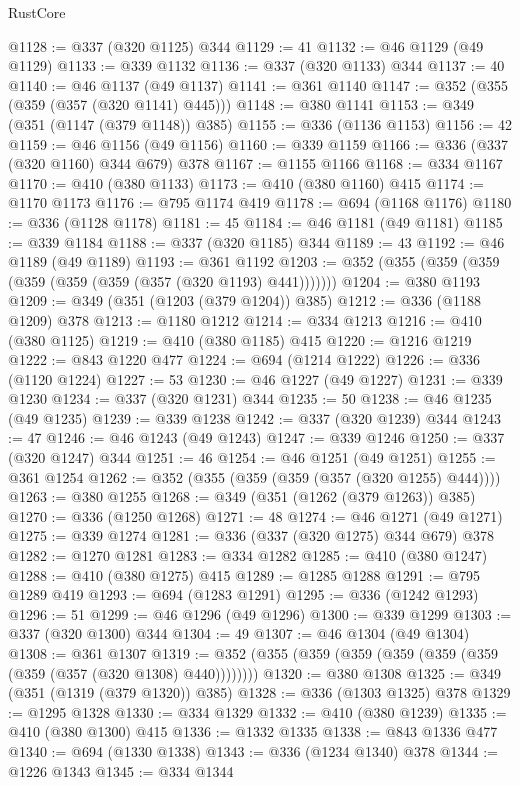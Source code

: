 \begin{lexlean}{RustCore}
\begin{coremodule}
@1128 := @337 (@320 @1125) @344
@1129 := 41
@1132 := @46 @1129 (@49 @1129)
@1133 := @339 @1132
@1136 := @337 (@320 @1133) @344
@1137 := 40
@1140 := @46 @1137 (@49 @1137)
@1141 := @361 @1140
@1147 := @352 (@355 (@359 (@357 (@320 @1141) @445)))
@1148 := @380 @1141
@1153 := @349 (@351 (@1147 (@379 @1148)) @385)
@1155 := @336 (@1136 @1153)
@1156 := 42
@1159 := @46 @1156 (@49 @1156)
@1160 := @339 @1159
@1166 := @336 (@337 (@320 @1160) @344 @679) @378
@1167 := @1155 @1166
@1168 := @334 @1167
@1170 := @410 (@380 @1133)
@1173 := @410 (@380 @1160) @415
@1174 := @1170 @1173
@1176 := @795 @1174 @419
@1178 := @694 (@1168 @1176)
@1180 := @336 (@1128 @1178)
@1181 := 45
@1184 := @46 @1181 (@49 @1181)
@1185 := @339 @1184
@1188 := @337 (@320 @1185) @344
@1189 := 43
@1192 := @46 @1189 (@49 @1189)
@1193 := @361 @1192
@1203 := @352 (@355 (@359 (@359 (@359 (@359 (@359 (@357 (@320 @1193) @441)))))))
@1204 := @380 @1193
@1209 := @349 (@351 (@1203 (@379 @1204)) @385)
@1212 := @336 (@1188 @1209) @378
@1213 := @1180 @1212
@1214 := @334 @1213
@1216 := @410 (@380 @1125)
@1219 := @410 (@380 @1185) @415
@1220 := @1216 @1219
@1222 := @843 @1220 @477
@1224 := @694 (@1214 @1222)
@1226 := @336 (@1120 @1224)
@1227 := 53
@1230 := @46 @1227 (@49 @1227)
@1231 := @339 @1230
@1234 := @337 (@320 @1231) @344
@1235 := 50
@1238 := @46 @1235 (@49 @1235)
@1239 := @339 @1238
@1242 := @337 (@320 @1239) @344
@1243 := 47
@1246 := @46 @1243 (@49 @1243)
@1247 := @339 @1246
@1250 := @337 (@320 @1247) @344
@1251 := 46
@1254 := @46 @1251 (@49 @1251)
@1255 := @361 @1254
@1262 := @352 (@355 (@359 (@359 (@357 (@320 @1255) @444))))
@1263 := @380 @1255
@1268 := @349 (@351 (@1262 (@379 @1263)) @385)
@1270 := @336 (@1250 @1268)
@1271 := 48
@1274 := @46 @1271 (@49 @1271)
@1275 := @339 @1274
@1281 := @336 (@337 (@320 @1275) @344 @679) @378
@1282 := @1270 @1281
@1283 := @334 @1282
@1285 := @410 (@380 @1247)
@1288 := @410 (@380 @1275) @415
@1289 := @1285 @1288
@1291 := @795 @1289 @419
@1293 := @694 (@1283 @1291)
@1295 := @336 (@1242 @1293)
@1296 := 51
@1299 := @46 @1296 (@49 @1296)
@1300 := @339 @1299
@1303 := @337 (@320 @1300) @344
@1304 := 49
@1307 := @46 @1304 (@49 @1304)
@1308 := @361 @1307
@1319 := @352 (@355 (@359 (@359 (@359 (@359 (@359 (@359 (@357 (@320 @1308) @440))))))))
@1320 := @380 @1308
@1325 := @349 (@351 (@1319 (@379 @1320)) @385)
@1328 := @336 (@1303 @1325) @378
@1329 := @1295 @1328
@1330 := @334 @1329
@1332 := @410 (@380 @1239)
@1335 := @410 (@380 @1300) @415
@1336 := @1332 @1335
@1338 := @843 @1336 @477
@1340 := @694 (@1330 @1338)
@1343 := @336 (@1234 @1340) @378
@1344 := @1226 @1343
@1345 := @334 @1344

\end{coremodule}
\end{lexlean}
